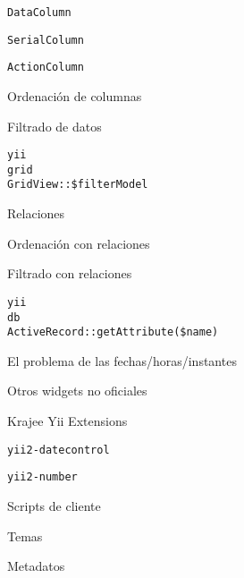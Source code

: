 \begin{longenum}
\begin{longenum}
\begin{longenum}
\begin{longenum}
\begin{longenum}
                    \item \texttt{DataColumn}
                    \item \texttt{SerialColumn}
                    \item \texttt{ActionColumn}
                \end{longenum}
                \item Ordenación de columnas
                \item Filtrado de datos
                \begin{longenum}
                    \item \texttt{yii\\grid\\GridView::\$filterModel}
                \end{longenum}
                \item Relaciones
                \begin{longenum}
                    \item Ordenación con relaciones
                    \item Filtrado con relaciones
                    \begin{longenum}
                        \item \texttt{yii\\db\\ActiveRecord::getAttribute(\$name)}
                    \end{longenum}
                \end{longenum}
            \end{longenum}
            \item El problema de las fechas/horas/instantes
            \item Otros widgets no oficiales
            \begin{longenum}
                \item Krajee Yii Extensions
                \begin{longenum}
                    \item \texttt{yii2-datecontrol}
                    \item \texttt{yii2-number}
                \end{longenum}
            \end{longenum}
        \end{longenum}
        \item Scripts de cliente
        \item Temas \opcional\
        \item Metadatos

\end{longenum}
\end{longenum}
